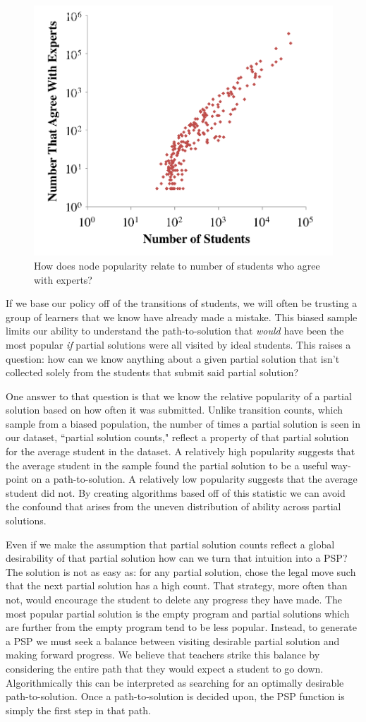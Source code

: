 \begin{figure}
\centering
\includegraphics[width=0.5\columnwidth]{img/wrongVsPopularity.png}
\caption[Partial solution popularity vs probability of optimal progress]{How does node popularity relate to number of students who agree with experts?}
\label{fig:confidence}
\end{figure}


If we base our policy off of the transitions of students, we will often be trusting a group of learners that we know have already made a mistake. This biased sample limits our ability to understand the path-to-solution that \emph{would} have been the most popular \emph{if} partial solutions were all visited by ideal students. This raises a question: how can we know anything about a given partial solution that isn't collected solely from the students that submit said partial solution? 

One answer to that question is that we know the relative popularity of a partial solution based on how often it was submitted. Unlike transition counts, which sample from a biased population, the number of times a partial solution is seen in our dataset, ``partial solution counts," reflect a property of that partial solution for the average student in the dataset. A relatively high popularity suggests that the average student in the sample found the partial solution to be a useful way-point on a path-to-solution. A relatively low popularity suggests that the average student did not. By creating algorithms based off of this statistic we can avoid the confound that arises from the uneven distribution of ability across partial solutions.

Even if we make the assumption that partial solution counts reflect a global desirability of that partial solution how can we turn that intuition into a PSP? The solution is not as easy as: for any partial solution, chose the legal move such that the next partial solution has a high count. That strategy, more often than not, would encourage the student to delete any progress they have made. The most popular partial solution is the empty program and partial solutions which are further from the empty program tend to be less popular. Instead, to generate a PSP we must seek a balance between visiting desirable partial solution and making forward progress. We believe that teachers strike this balance by considering the entire path that they would expect a student to go down. Algorithmically this can be interpreted as searching for an optimally desirable path-to-solution. Once a path-to-solution is decided upon, the PSP function is simply the first step in that path.

